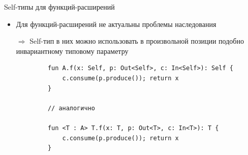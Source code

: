 \documentclass[usenames, dvipsnames]{beamer}
\begin{document}
    \begin{frame}[fragile]{Self-типы для функций-расширений}
        \begin{itemize}
            \item Для функций-расширений не актуальны проблемы наследования
            \item[$\Rightarrow$] Self-тип в них можно использовать в произвольной позиции подобно инвариантному типовому параметру
        \end{itemize}

        \vspace{1em}
        \begin{verbatim}
            fun A.f(x: Self, p: Out<Self>, c: In<Self>): Self {
                c.consume(p.produce()); return x
            }

            // аналогично

            fun <T : A> T.f(x: T, p: Out<T>, c: In<T>): T {
                c.consume(p.produce()); return x
            }
        \end{verbatim}
    \end{frame}
\end{document}
